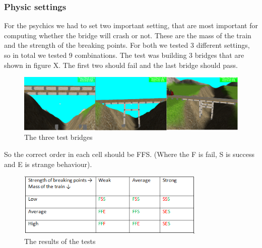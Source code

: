 \subsubsection{Physic settings}
For the psychics we had to set two important setting, that are most important for computing whether the bridge will crash or not. These are the mass of the train and the strength of the breaking points. For both we tested 3 different settings, so in total we tested 9 combinations. The test was building 3 bridges that are shown in figure X. The first two should fail and the last bridge should pass. \\
\begin{figure}[H]
    \centering
    \includegraphics[width=1.0\textwidth]{screenshots/bridges.png}
    \caption{The three test bridges}
    \label{fig:bridges}
\end{figure}
So the correct order in each cell should be FFS. (Where the F is fail, S is success and E is strange behaviour). \\
\begin{figure}[H]
    \centering
    \includegraphics[width=0.8\textwidth]{screenshots/table.png}
    \caption{The results of the tests}
    \label{fig:table}
\end{figure}
